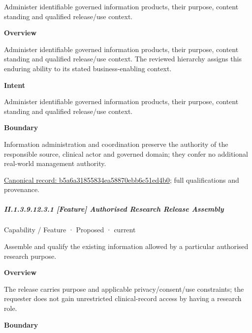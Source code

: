Administer identifiable governed information products, their purpose, content standing and qualified release/use context.



\textbf{Overview}



Administer identifiable governed information products, their purpose, content standing and qualified release/use context. The reviewed hierarchy assigns this enduring ability to its stated business-enabling context.



\textbf{Intent}



Administer identifiable governed information products, their purpose, content standing and qualified release/use context.



\textbf{Boundary}



Information administration and coordination preserve the authority of the responsible source, clinical actor and governed domain; they confer no additional real-world management authority.


{\footnotesize \href{../../../../continuum/strategy/capability/b5a6a31855834ea58870ebb6c51ed4b0.md}{Canonical record: b5a6a31855834ea58870ebb6c51ed4b0}; full qualifications and provenance.}\par
\subparagraph*{II.1.3.9.12.3.1 [Feature] Authorised Research Release Assembly}
\label{navigation:II.1.3.9.12.3.1}

\label{element:dcebc2f2b5b7494a8e80a02402664078}
{\small Capability / Feature · Proposed · current}\par

Assemble and qualify the existing information allowed by a particular authorised research purpose.



\textbf{Overview}



The release carries purpose and applicable privacy/consent/use constraints; the requester does not gain unrestricted clinical-record access by having a research role.



\textbf{Boundary}



